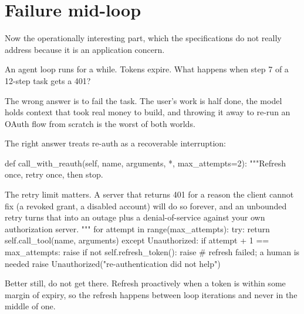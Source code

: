 
\section{Failure mid-loop}

Now the operationally interesting part, which the specifications do not really
address because it is an application concern.

An agent loop runs for a while. Tokens expire. What happens when step 7 of a
12-step task gets a 401?

The wrong answer is to fail the task. The user's work is half done, the model
holds context that took real money to build, and throwing it away to re-run an
OAuth flow from scratch is the worst of both worlds.

The right answer treats re-auth as a recoverable interruption:

\begin{py}
def call_with_reauth(self, name, arguments, *, max_attempts=2):
    """Refresh once, retry once, then stop.

    The retry limit matters. A server that returns 401 for a reason the
    client cannot fix (a revoked grant, a disabled account) will do so
    forever, and an unbounded retry turns that into an outage plus a
    denial-of-service against your own authorization server.
    """
    for attempt in range(max_attempts):
        try:
            return self.call_tool(name, arguments)
        except Unauthorized:
            if attempt + 1 == max_attempts:
                raise
            if not self.refresh_token():
                raise            # refresh failed; a human is needed
    raise Unauthorized("re-authentication did not help")
\end{py}

Better still, do not get there. Refresh proactively when a token is within some margin of expiry, so the
refresh happens between loop iterations and never in the middle of one.

